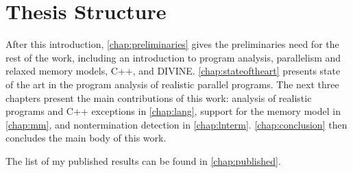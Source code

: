 \section{Thesis Structure}

After this introduction, \autoref{chap:preliminaries} gives the preliminaries
need for the rest of the work, including an introduction to program analysis, parallelism and relaxed memory models, C++, and DIVINE.
\autoref{chap:stateoftheart} presents state of the art in the program analysis
of realistic parallel programs.
The next three chapters present the main contributions of this work: analysis of
realistic programs and C++ exceptions in \autoref{chap:lang}, support for the
\xtso memory model in \autoref{chap:mm}, and nontermination detection in
\autoref{chap:lnterm}.
\autoref{chap:conclusion} then concludes the main body of this work.

The list of my published results can be found in \autoref{chap:published}.

